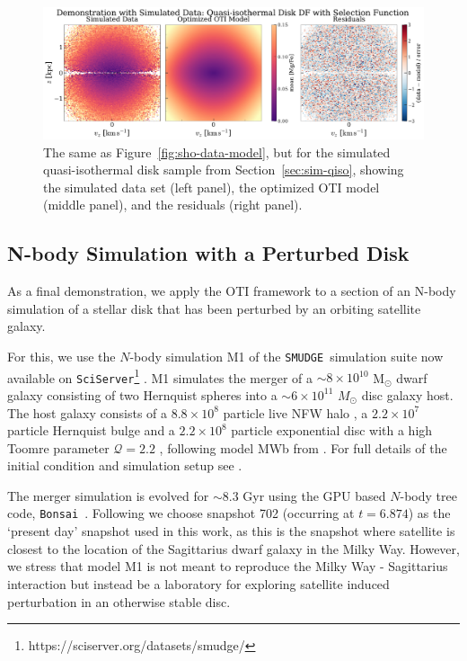 \begin{figure}[t!]
\begin{center}
\includegraphics[width=\textwidth]{qiso-sel-data-model.pdf}
\end{center}
\caption{%
The same as Figure~\ref{fig:sho-data-model}, but for the simulated quasi-isothermal disk
sample from Section~\ref{sec:sim-qiso}, showing the simulated data set (left panel), the
optimized OTI model (middle panel), and the residuals (right panel).
\label{fig:qiso-sel-data-model}
}
\end{figure}


\subsection{N-body Simulation with a Perturbed Disk}
\label{sec:sim-jason}

As a final demonstration, we apply the OTI framework to a section of an N-body simulation of a stellar disk that has been perturbed by an orbiting satellite galaxy.

For this, we use the $N$-body simulation M1 of the \texttt{SMUDGE}\ simulation suite \cite{Hunt:2021} now available on \texttt{SciServer}\footnote{https://sciserver.org/datasets/smudge/} \citep{sciserver}. M1 simulates the merger of a $\sim8\times10^{10}$ M$_{\odot}$ dwarf galaxy consisting of two Hernquist spheres \citep{Hernquist:1990} into a $\sim6\times10^{11}$ $M_{\odot}$ disc galaxy host. The host galaxy consists of a $8.8\times10^8$ particle live NFW halo \citep{Navarro:1997}, a $2.2\times10^7$ particle Hernquist bulge and a $2.2\times10^8$ particle exponential disc with a high Toomre parameter $\mathcal{Q}=2.2$ \citep{Toomre:1964}, following model MWb from \cite{Widrow:2005}. For full details of the initial condition and simulation setup see \cite{Hunt:2021}.

The merger simulation is evolved for $\sim8.3$ Gyr using the GPU based $N$-body tree code, \texttt{Bonsai}\ \citep{Bedorf:2012,Bedorf:2014}. Following \cite{Hunt:2021} we choose snapshot 702 (occurring at $t=6.874$) as the `present day' snapshot used in this work, as this is the snapshot where satellite is closest to the location of the Sagittarius dwarf galaxy in the Milky Way. However, we stress that model M1 is not meant to reproduce the Milky Way - Sagittarius interaction \citep[instead see][]{Bennett:2022} but instead be a laboratory for exploring satellite induced perturbation in an otherwise stable disc.


